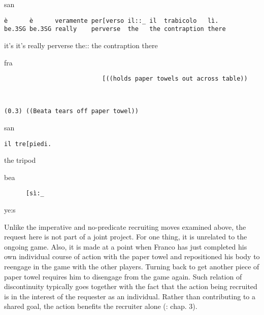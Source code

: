 \documentclass[output=paper,modfonts]{langscibook}
\begin{document}
%
\begin{transbox}{7}{san}
\begin{verbatim}
è      è      veramente per[verso il::_ il  trabicolo   lì.
be.3SG be.3SG really    perverse  the   the contraption there
\end{verbatim}
it's it's really perverse the:: the contraption there
\end{transbox}\vspace{1mm}
%
\begin{transbox}{8}{fra}
\begin{verbatim}
                           [((holds paper towels out across table))
\end{verbatim}
\end{transbox}
%
\begin{transbox}{9}{~}
\begin{verbatim}
(0.3) ((Beata tears off paper towel))
\end{verbatim}
\end{transbox}
%
\begin{transbox}{10}{san}
\begin{verbatim}
il tre[piedi.
\end{verbatim}
the tripod
\end{transbox}
%
\begin{transbox}{11}{bea}
\begin{verbatim}
      [sì:_
\end{verbatim}
\hspace{0.95cm} ye:s
\end{transbox}\bigskip

\label{par:rossi:unilateral} Unlike the imperative and no-predicate recruiting moves examined above, the request here is not part of a joint project. For one thing, it is unrelated to the ongoing game. Also, it is made at a point when Franco has just completed his own individual course of action with the paper towel and repositioned his body to reengage in the game with the other players. Turning back to get another piece of paper towel requires him to disengage from the game again. %
Such relation of discontinuity typically goes together with the fact that the action being recruited is in the interest of the requester as an individual. Rather than contributing to a shared goal, the action benefits the recruiter alone (\citealt{Rossi2012,Rossi2015a}: chap. 3).
\end{document}
